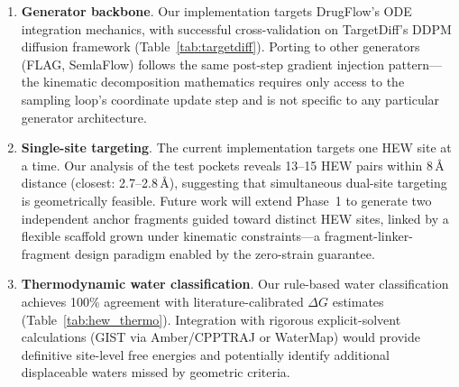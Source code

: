 \documentclass{article}
\begin{document}
\begin{enumerate}[leftmargin=*]
  \item \textbf{Generator backbone}.  Our implementation targets DrugFlow's
    ODE integration mechanics, with successful cross-validation on
    TargetDiff's DDPM diffusion framework (Table~\ref{tab:targetdiff}).
    Porting to other generators (FLAG, SemlaFlow) follows the same
    post-step gradient injection pattern---the kinematic decomposition
    mathematics requires only access to the
    sampling loop's coordinate update step and is not specific to any
    particular generator architecture.

  \item \textbf{Single-site targeting}.  The current implementation targets
    one HEW site at a time.  Our analysis of the test pockets reveals
    13--15 HEW pairs within 8\,\AA{} distance (closest: 2.7--2.8\,\AA),
    suggesting that simultaneous dual-site targeting is geometrically
    feasible.  Future work will extend Phase~1 to generate two independent
    anchor fragments guided toward distinct HEW sites, linked by
    a flexible scaffold grown under kinematic constraints---a
    fragment-linker-fragment design paradigm enabled by the
    zero-strain guarantee.

  \item \textbf{Thermodynamic water classification}.  Our rule-based water
    classification achieves 100\% agreement with literature-calibrated
    $\Delta G$ estimates (Table~\ref{tab:hew_thermo}).  Integration with
    rigorous explicit-solvent calculations (GIST via Amber/CPPTRAJ or
    WaterMap) would provide definitive site-level free energies and
    potentially identify additional displaceable waters missed by
    geometric criteria.


\end{enumerate}
\end{document}

